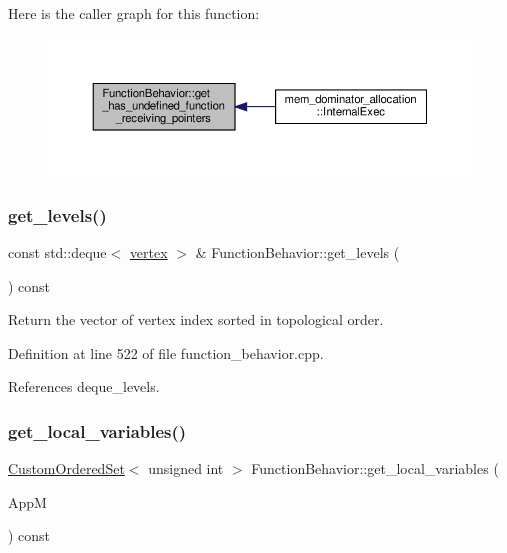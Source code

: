 Here is the caller graph for this function\+:
\nopagebreak
\begin{figure}[H]
\begin{center}
\leavevmode
\includegraphics[width=350pt]{d9/d45/classFunctionBehavior_af51fe56b7c40304ec996f46833c92832_icgraph}
\end{center}
\end{figure}
\mbox{\label{classFunctionBehavior_ae5e522f19aaba808e79e309ea0fcb4e0}} 
\subsubsection{\texorpdfstring{get\+\_\+levels()}{get\_levels()}}
{\footnotesize\ttfamily const std\+::deque$<$ \hyperlink{graph_8hpp_abefdcf0544e601805af44eca032cca14}{vertex} $>$ \& Function\+Behavior\+::get\+\_\+levels (\begin{DoxyParamCaption}{ }\end{DoxyParamCaption}) const}



Return the vector of vertex index sorted in topological order. 



Definition at line 522 of file function\+\_\+behavior.\+cpp.



References deque\+\_\+levels.

\mbox{\label{classFunctionBehavior_ae374b1fed33e729569ae9edd0e08de08}} 
\subsubsection{\texorpdfstring{get\+\_\+local\+\_\+variables()}{get\_local\_variables()}}
{\footnotesize\ttfamily \hyperlink{classCustomOrderedSet}{Custom\+Ordered\+Set}$<$ unsigned int $>$ Function\+Behavior\+::get\+\_\+local\+\_\+variables (\begin{DoxyParamCaption}\item[{const \hyperlink{application__manager_8hpp_abb985163a2a3fb747f6f03b1eaadbb44}{application\+\_\+manager\+Const\+Ref}}]{AppM }\end{DoxyParamCaption}) const}



